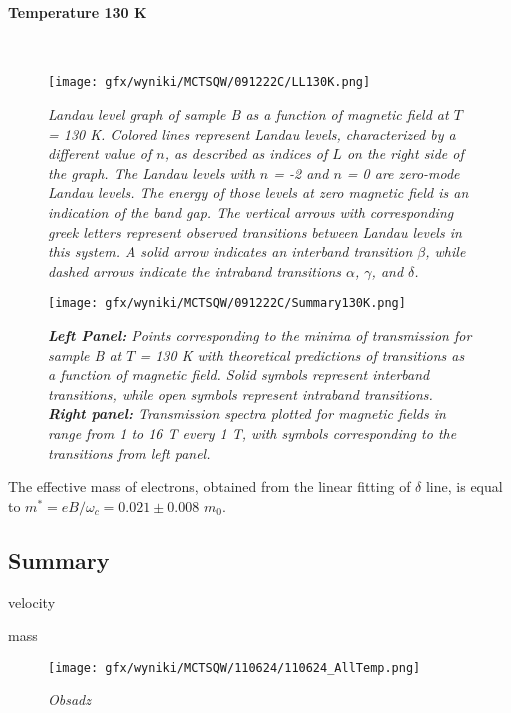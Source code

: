 \documentclass[titlepage,a4paper]{book}
\newcommand{\wciecie}{\quad\phantom{v}}
\newcommand{\myparagraph}[1]{\paragraph{#1}\mbox{}\\}
\begin{document}
\clearpage
\myparagraph{Temperature 130 K}
\begin{figure}[ht]
	\centering
	\texttt{[image: gfx/wyniki/MCTSQW/091222C/LL130K.png]}
	\vspace{-10pt}
	\caption{\textit{Landau level graph of sample B as a function of magnetic field at $T$ = 130 K. Colored lines represent Landau levels, characterized by a different value of $n$, as described as indices of $L$ on the right side of the graph. The Landau levels with $n$ = -2 and $n$ = 0 are zero-mode Landau levels. The energy of those levels at zero magnetic field is an indication of the band gap. The vertical arrows with corresponding greek letters represent observed transitions between Landau levels in this system. A solid arrow indicates an interband transition $\beta$, while dashed arrows indicate the intraband transitions $\alpha$, $\gamma$, and $\delta$.}}
	\label{fig:LL_SQW_130K}
\end{figure}
\begin{figure}[ht]
	\centering
	\texttt{[image: gfx/wyniki/MCTSQW/091222C/Summary130K.png]}
	\vspace{-10pt}
	\caption{\textit{\textbf{Left Panel:} Points corresponding to the minima of transmission for sample B at $T$ = 130 K with theoretical predictions of transitions as a function of magnetic field. Solid symbols represent interband transitions, while open symbols represent intraband transitions. \textbf{Right panel:} Transmission spectra plotted for magnetic fields in range from 1 to 16 T every 1 T, with symbols corresponding to the transitions from left panel.}}
	\label{fig:Summary_SQW_130K}
\end{figure}

The effective mass of electrons, obtained from the linear fitting of $\delta$ line, is equal to $m^* = eB/\omega_c = 0.021 \pm 0.008$ $m_0$.

\clearpage
\subsection{Summary}
\wciecie

velocity \cite{Ludwig_MCT_QW}

mass \cite{Orlita_MCT_QW}

\begin{figure}[ht]
	\centering
	\texttt{[image: gfx/wyniki/MCTSQW/110624/110624\_AllTemp.png]}
	\vspace{-10pt}
	\caption{\textit{Obsadz}}
	\label{fig:110624_AllTemp}
\end{figure}
\end{document}

